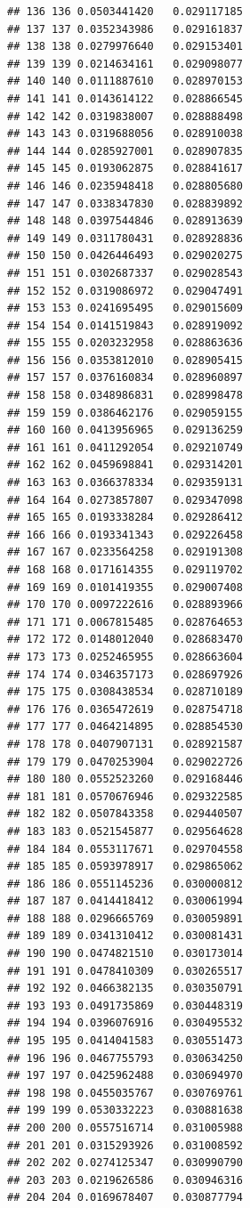 \documentclass[
]{book}
\begin{document}
\begin{verbatim}
## 136 136 0.0503441420   0.029117185
## 137 137 0.0352343986   0.029161837
## 138 138 0.0279976640   0.029153401
## 139 139 0.0214634161   0.029098077
## 140 140 0.0111887610   0.028970153
## 141 141 0.0143614122   0.028866545
## 142 142 0.0319838007   0.028888498
## 143 143 0.0319688056   0.028910038
## 144 144 0.0285927001   0.028907835
## 145 145 0.0193062875   0.028841617
## 146 146 0.0235948418   0.028805680
## 147 147 0.0338347830   0.028839892
## 148 148 0.0397544846   0.028913639
## 149 149 0.0311780431   0.028928836
## 150 150 0.0426446493   0.029020275
## 151 151 0.0302687337   0.029028543
## 152 152 0.0319086972   0.029047491
## 153 153 0.0241695495   0.029015609
## 154 154 0.0141519843   0.028919092
## 155 155 0.0203232958   0.028863636
## 156 156 0.0353812010   0.028905415
## 157 157 0.0376160834   0.028960897
## 158 158 0.0348986831   0.028998478
## 159 159 0.0386462176   0.029059155
## 160 160 0.0413956965   0.029136259
## 161 161 0.0411292054   0.029210749
## 162 162 0.0459698841   0.029314201
## 163 163 0.0366378334   0.029359131
## 164 164 0.0273857807   0.029347098
## 165 165 0.0193338284   0.029286412
## 166 166 0.0193341343   0.029226458
## 167 167 0.0233564258   0.029191308
## 168 168 0.0171614355   0.029119702
## 169 169 0.0101419355   0.029007408
## 170 170 0.0097222616   0.028893966
## 171 171 0.0067815485   0.028764653
## 172 172 0.0148012040   0.028683470
## 173 173 0.0252465955   0.028663604
## 174 174 0.0346357173   0.028697926
## 175 175 0.0308438534   0.028710189
## 176 176 0.0365472619   0.028754718
## 177 177 0.0464214895   0.028854530
## 178 178 0.0407907131   0.028921587
## 179 179 0.0470253904   0.029022726
## 180 180 0.0552523260   0.029168446
## 181 181 0.0570676946   0.029322585
## 182 182 0.0507843358   0.029440507
## 183 183 0.0521545877   0.029564628
## 184 184 0.0553117671   0.029704558
## 185 185 0.0593978917   0.029865062
## 186 186 0.0551145236   0.030000812
## 187 187 0.0414418412   0.030061994
## 188 188 0.0296665769   0.030059891
## 189 189 0.0341310412   0.030081431
## 190 190 0.0474821510   0.030173014
## 191 191 0.0478410309   0.030265517
## 192 192 0.0466382135   0.030350791
## 193 193 0.0491735869   0.030448319
## 194 194 0.0396076916   0.030495532
## 195 195 0.0414041583   0.030551473
## 196 196 0.0467755793   0.030634250
## 197 197 0.0425962488   0.030694970
## 198 198 0.0455035767   0.030769761
## 199 199 0.0530332223   0.030881638
## 200 200 0.0557516714   0.031005988
## 201 201 0.0315293926   0.031008592
## 202 202 0.0274125347   0.030990790
## 203 203 0.0219626586   0.030946316
## 204 204 0.0169678407   0.030877794

\end{verbatim}
\end{document}
